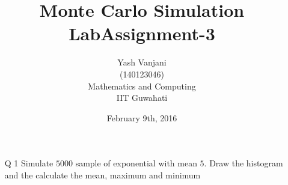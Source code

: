 \documentclass[12pt]{book}
\begin{document}
\title{\textbf{Monte Carlo Simulation Lab}}	
\title{\textbf{Assignment-3}}
\author{Yash Vanjani\\(140123046)\\Mathematics and Computing\\IIT Guwahati}
\date{February 9th, 2016}

\maketitle

\newpage
\begin{enumerate}
\item[Q 1] Simulate $5000$ sample of exponential with mean $5$. Draw the histogram and the calculate the mean, maximum and minimum
\end{enumerate}
\end{document}
